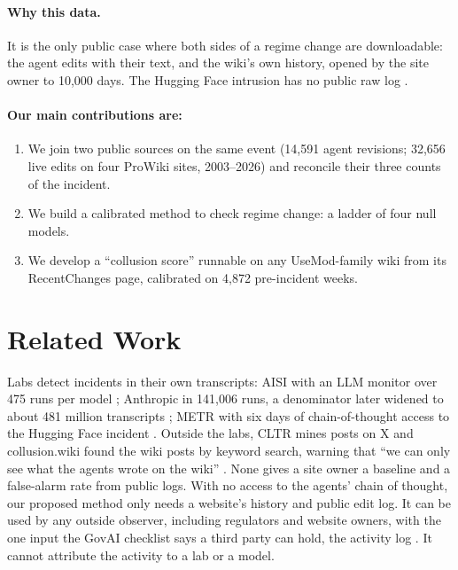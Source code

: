 \documentclass[10pt,a4paper]{article}
\begin{document}
\paragraph{Why this data.} It is the only public case where both sides of a regime change are downloadable: the agent edits with their text, and the wiki's own history, opened by the site owner to 10,000 days. The Hugging Face intrusion has no public raw log \citep{AnatomyFrontierLab2026,beyarkayboydkanePublicEvidenceOpenAIHuggingFace2026}.

\paragraph{Our main contributions are:}
\begin{enumerate}
\item We join two public sources on the same event (14,591 agent revisions; 32,656 live edits on four ProWiki sites, 2003--2026) and reconcile their three counts of the incident.
\item We build a calibrated method to check regime change: a ladder of four null models.
\item We develop a ``collusion score'' runnable on any UseMod-family wiki from its RecentChanges page, calibrated on 4,872 pre-incident weeks.
\end{enumerate}

\section{Related Work}

Labs detect incidents in their own transcripts: AISI with an LLM monitor over 475 runs per model \citep{aisi2026cheating,register2026cheating}; Anthropic in 141,006 runs, a denominator later widened to about 481 million transcripts \citep{InvestigatingThreeIncidents,anthropic2026assessment}; METR with six days of chain-of-thought access to the Hugging Face incident \citep{BriefIndependentInvestigation2026}. Outside the labs, CLTR mines posts on X \citep{cltr2026observatory} and collusion.wiki found the wiki posts by keyword search, warning that ``we can only see what the agents wrote on the wiki'' \citep{collusionwiki2026}. None gives a site owner a baseline and a false-alarm rate from public logs. With no access to the agents' chain of thought, our proposed method only needs a website's history and public edit log. It can be used by any outside observer, including regulators and website owners, with the one input the GovAI checklist says a third party can hold, the activity log \citep{ezell2025incident}. It cannot attribute the activity to a lab or a model.
\end{document}
